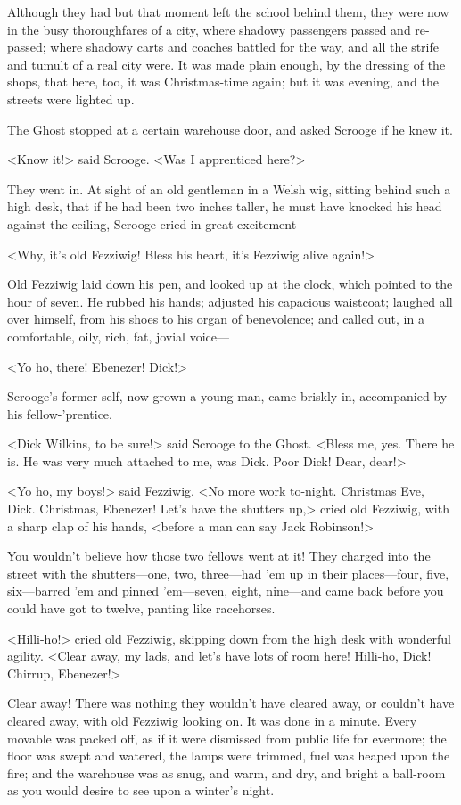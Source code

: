 Although they had but that moment left the school behind them, they were now in
the busy thoroughfares of a city, where shadowy passengers passed and re-passed;
where shadowy carts and coaches battled for the way, and all the strife and
tumult of a real city were. It was made plain enough, by the dressing of the
shops, that here, too, it was Christmas-time again; but it was evening, and the
streets were lighted up.

The Ghost stopped at a certain warehouse door, and asked Scrooge if he knew it.

<Know it!> said Scrooge. <Was I apprenticed here?>

They went in. At sight of an old gentleman in a Welsh wig, sitting behind such a
high desk, that if he had been two inches taller, he must have knocked his head
against the ceiling, Scrooge cried in great excitement—

<Why, it's old Fezziwig! Bless his heart, it's Fezziwig alive again!>

Old Fezziwig laid down his pen, and looked up at the clock, which pointed to the
hour of seven. He rubbed his hands; adjusted his capacious waistcoat; laughed
all over himself, from his shoes to his organ of benevolence; and called out, in
a comfortable, oily, rich, fat, jovial voice—

<Yo ho, there! Ebenezer! Dick!>

Scrooge's former self, now grown a young man, came briskly in, accompanied by
his fellow-'prentice.

<Dick Wilkins, to be sure!> said Scrooge to the Ghost. <Bless me, yes. There he
is. He was very much attached to me, was Dick. Poor Dick! Dear, dear!>

<Yo ho, my boys!> said Fezziwig. <No more work to-night. Christmas Eve, Dick.
Christmas, Ebenezer! Let's have the shutters up,> cried old Fezziwig, with a
sharp clap of his hands, <before a man can say Jack Robinson!>

You wouldn't believe how those two fellows went at it! They charged into the
street with the shutters—one, two, three—had 'em up in their places—four, five,
six—barred 'em and pinned 'em—seven, eight, nine—and came back before you could
have got to twelve, panting like racehorses.

<Hilli-ho!> cried old Fezziwig, skipping down from the high desk with wonderful
agility. <Clear away, my lads, and let's have lots of room here! Hilli-ho, Dick!
Chirrup, Ebenezer!>

Clear away! There was nothing they wouldn't have cleared away, or couldn't have
cleared away, with old Fezziwig looking on. It was done in a minute. Every
movable was packed off, as if it were dismissed from public life for evermore;
the floor was swept and watered, the lamps were trimmed, fuel was heaped upon
the fire; and the warehouse was as snug, and warm, and dry, and bright a
ball-room as you would desire to see upon a winter's night.

